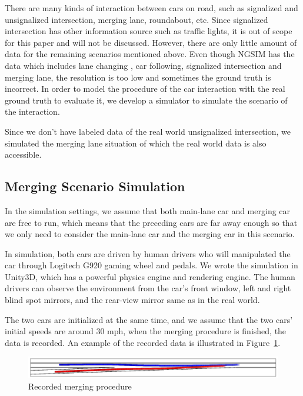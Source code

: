 \documentclass[conference]{IEEEtran}
\begin{document}
There are many kinds of interaction between cars on road, such as signalized and unsignalized intersection, merging lane, roundabout, etc. Since signalized intersection has other information source such as traffic lights, it is out of scope for this paper and will not be discussed. However, there are only little amount of data for the remaining scenarios mentioned above. Even though NGSIM has the data which includes lane changing , car following, signalized intersection and merging lane, the resolution is too low and sometimes the ground truth is incorrect. In order to model the procedure of the car interaction with the real ground truth to evaluate it, we develop a simulator to simulate the scenario of the interaction. 

Since we don't have labeled data of the real world unsignalized intersection, we simulated the merging lane situation of which the real world data is also accessible. 

\subsection{Merging Scenario Simulation}
In the simulation settings, we assume that both main-lane car and merging car are free to run, which means that the preceding cars are far away enough so that we only need to consider the main-lane car and the merging car in this scenario. 

In simulation, both cars are driven by human drivers who will manipulated the car through Logitech G920 gaming wheel and pedals. We wrote the simulation in Unity3D, which has a powerful physics engine and rendering engine. The human drivers can observe the environment from the car's front window, left and right blind spot mirrors, and the rear-view mirror same as in the real world.

The two cars are initialized at the same time, and we assume that the two cars' initial speeds are around 30 mph, when the merging procedure is finished, the data is recorded. An example of the recorded data is illustrated in Figure~\ref{fig:mergeRec}.

\begin{figure}[t]
	\centering
	\includegraphics[scale=0.4]{scene_real.png}
	\caption{Recorded merging procedure}
	\label{fig:mergeRec}
\end{figure}
\end{document}
